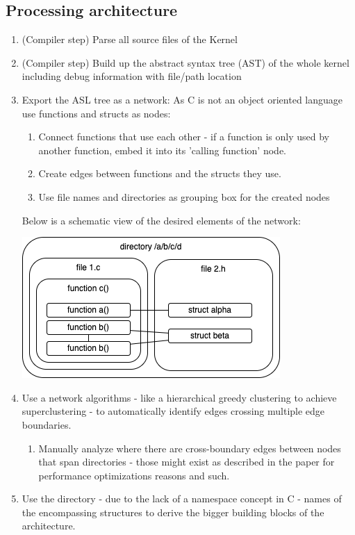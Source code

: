 \documentclass{article}
\begin{document}
\subsection*{Processing architecture}

\begin{enumerate}
	\item (Compiler step) Parse all source files of the Kernel
	\item (Compiler step) Build up the abstract syntax tree (AST) of the whole kernel including debug information with file/path location
	\item Export the ASL tree as a network: As C is not an object oriented language use functions and structs as nodes: 
	\begin{enumerate}
		\item Connect functions that use each other - if a function is only used by another function, embed it into its 'calling function' node.
		\item Create edges between functions and the structs they use.
		\item Use file names and directories as grouping box for the created nodes
	\end{enumerate}
	Below is a schematic view of the desired elements of the network:
		
		\includegraphics{schema}   

	\item Use a network algorithms - like a hierarchical greedy clustering to achieve superclustering - to automatically identify edges crossing multiple edge boundaries.
	
	\begin{enumerate}
		\item Manually analyze where there are cross-boundary edges between nodes that span directories - those might exist as described in the paper for performance optimizations reasons and such. 
	\end{enumerate}


	\item Use the directory - due to the lack of a namespace concept in C - names of the encompassing structures to derive the bigger building blocks of the architecture.
\end{enumerate}
\end{document}
